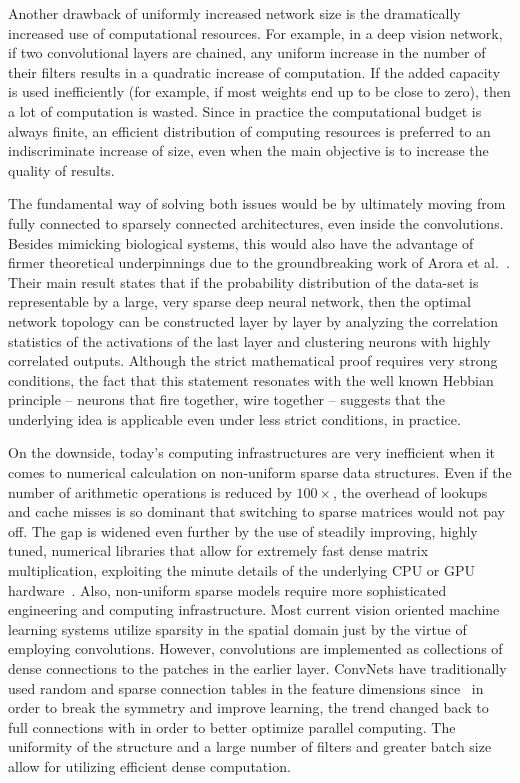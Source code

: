 Another drawback of uniformly increased network size is the dramatically increased use of computational resources. For example, in a deep vision network, if two convolutional layers are chained, any uniform increase in the number of their filters results in a quadratic increase of computation. If the added capacity is used inefficiently (for example, if most weights end up to be close to zero), then a lot of computation is wasted. Since in practice the computational budget is always finite, an efficient distribution of computing resources is preferred to an indiscriminate increase of size, even when the main objective is to increase the quality of results.

The fundamental way of solving both issues would be by ultimately moving from fully connected to sparsely connected architectures, even inside the convolutions. Besides mimicking biological systems, this would also have the advantage of firmer theoretical underpinnings due to the groundbreaking work of Arora et al.~\cite{arora2013bounds}. Their main result states that if the probability distribution of the data-set is representable by a large, very sparse deep neural network, then the optimal network topology can be constructed layer by layer by analyzing the correlation statistics of the activations of the last layer and clustering neurons with highly correlated outputs. Although the strict mathematical proof requires very strong conditions, the fact that this statement resonates with the well known Hebbian principle -- neurons that fire together, wire together -- suggests that the underlying idea is applicable even under less strict conditions, in practice.

On the downside, today’s computing infrastructures are very inefficient when it comes to numerical calculation on non-uniform sparse data structures. Even if the number of arithmetic operations is reduced by $100{\times}$, the overhead of lookups and cache misses is so dominant that switching to sparse matrices would not pay off. The gap is widened even further by the use of steadily improving, highly tuned, numerical libraries that allow for extremely fast dense matrix multiplication, exploiting the minute details of the underlying CPU or GPU hardware~\cite{song2014scaling, krizhevsky2012imagenet}. Also, non-uniform sparse models require more sophisticated engineering and computing infrastructure. Most current vision oriented machine learning systems utilize sparsity in the spatial domain just by the virtue of employing convolutions. However, convolutions are implemented as collections of dense connections to the patches in the earlier layer. ConvNets have traditionally used random and sparse connection tables in the feature dimensions since~\cite{lecun1998gradient} in order to break the symmetry and improve learning, the trend changed back to full connections with \cite{krizhevsky2012imagenet} in order to better optimize parallel computing. The uniformity of the structure and a large number of filters and greater batch size allow for utilizing efficient dense computation.

